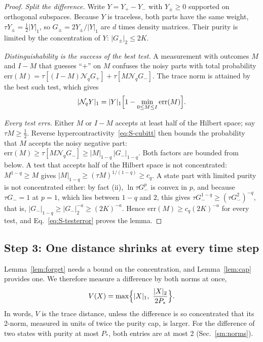 \documentclass[aps,prl,twocolumn,superscriptaddress,floatfix]{revtex4-2}
\theoremstyle{plain}
\newcommand{\nrm}[2]{\lvert #1\rvert_{#2}}
\newcommand{\Nq}{\mathcal N_q}
\begin{document}
\begin{proof}
\emph{Split the difference.} Write $Y=Y_+-Y_-$ with $Y_\pm\ge0$ supported on orthogonal subspaces. Because $Y$ is traceless, both parts have the same weight, $\tau Y_\pm=\frac12\nrm Y1$, so $G_\pm=2Y_\pm/\nrm Y1$ are $d$ times density matrices. Their purity is limited by the concentration of $Y$: $\nrm{G_\pm}2\le2K$.

\emph{Distinguishability is the success of the best test.} A measurement with outcomes $M$ and $I-M$ that guesses ``$+$'' on $M$ confuses the noisy parts with total probability $\mathrm{err}(M)=\tau[(I-M)\Nq G_+]+\tau[M\Nq G_-]$. The trace norm is attained by the best such test, which gives
\begin{equation}
\nrm{\Nq Y}1=\nrm Y1\Bigl[1-\min_{0\le M\le I}\mathrm{err}(M)\Bigr].
\label{eq:S-testerror}
\end{equation}

\emph{Every test errs.} Either $M$ or $I-M$ accepts at least half of the Hilbert space; say $\tau M\ge\frac12$. Reverse hypercontractivity~\eqref{eq:S-cubitt} then bounds the probability that $M$ accepts the noisy negative part: $\mathrm{err}(M)\ge\tau[M\Nq G_-]\ge\nrm M{1-q}\,\nrm{G_-}{1-q}$. Both factors are bounded from below. A test that accepts half of the Hilbert space is not concentrated: $M^{1-q}\ge M$ gives $\nrm M{1-q}\ge(\tau M)^{1/(1-q)}\ge c_q$. A state part with limited purity is not concentrated either: by fact (ii), $\ln\tau G_-^p$ is convex in $p$, and because $\tau G_-=1$ at $p=1$, which lies between $1-q$ and $2$, this gives $\tau G_-^{1-q}\ge(\tau G_-^2)^{-q}$, that is, $\nrm{G_-}{1-q}\ge\nrm{G_-}2^{-a}\ge(2K)^{-a}$. Hence $\mathrm{err}(M)\ge c_q(2K)^{-a}$ for every test, and Eq.~\eqref{eq:S-testerror} proves the lemma.
\end{proof}

\subsection{Step 3: One distance shrinks at every time step}
\label{sm:contract}

Lemma~\ref{lem:forget} needs a bound on the concentration, and Lemma~\ref{lem:cap} provides one. We therefore measure a difference by both norms at once,
\begin{equation}
V(X)=\max\Bigl\{\nrm X1,\ \frac{\nrm X2}{2P_*}\Bigr\}.
\label{eq:S-V}
\end{equation}
In words, $V$ is the trace distance, unless the difference is so concentrated that its 2-norm, measured in units of twice the purity cap, is larger. For the difference of two states with purity at most $P_*$, both entries are at most 2 (Sec.~\ref{sm:norms}).
\end{document}

